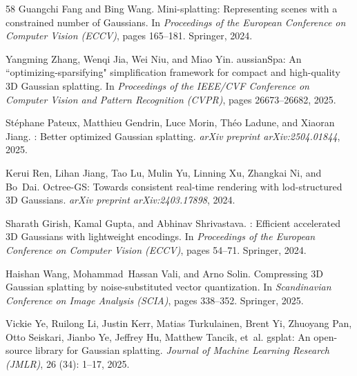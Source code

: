 \documentclass{article}
\begin{document}
\begin{thebibliography}{58}
Guangchi Fang and Bing Wang.
\newblock Mini-splatting: Representing scenes with a constrained number of
  {G}aussians.
\newblock In \emph{Proceedings of the European Conference on Computer Vision
  (ECCV)}, pages 165--181. Springer, 2024.

Yangming Zhang, Wenqi Jia, Wei Niu, and Miao Yin.
aussian{S}pa: An ``optimizing-sparsifying" simplification
  framework for compact and high-quality 3{D} {G}aussian splatting.
\newblock In \emph{Proceedings of the IEEE/CVF Conference on Computer Vision
  and Pattern Recognition (CVPR)}, pages 26673--26682, 2025.

St{\'e}phane Pateux, Matthieu Gendrin, Luce Morin, Th{\'e}o Ladune, and Xiaoran
  Jiang.
: Better optimized {G}aussian splatting.
\newblock \emph{arXiv preprint arXiv:2504.01844}, 2025.

Kerui Ren, Lihan Jiang, Tao Lu, Mulin Yu, Linning Xu, Zhangkai Ni, and Bo~Dai.
\newblock Octree-{GS}: Towards consistent real-time rendering with
  lod-structured 3{D} {G}aussians.
\newblock \emph{arXiv preprint arXiv:2403.17898}, 2024.

Sharath Girish, Kamal Gupta, and Abhinav Shrivastava.
: Efficient accelerated 3{D} {G}aussians with lightweight
  encodings.
\newblock In \emph{Proceedings of the European Conference on Computer Vision
  (ECCV)}, pages 54--71. Springer, 2024.

Haishan Wang, Mohammad~Hassan Vali, and Arno Solin.
\newblock Compressing {3D} {G}aussian splatting by noise-substituted vector
  quantization.
\newblock In \emph{Scandinavian Conference on Image Analysis (SCIA)}, pages
  338--352. Springer, 2025.

Vickie Ye, Ruilong Li, Justin Kerr, Matias Turkulainen, Brent Yi, Zhuoyang Pan,
  Otto Seiskari, Jianbo Ye, Jeffrey Hu, Matthew Tancik, et~al.
\newblock gsplat: An open-source library for {G}aussian splatting.
\newblock \emph{Journal of Machine Learning Research (JMLR)}, 26
  (34): 1--17, 2025.


\end{thebibliography}
\end{document}
